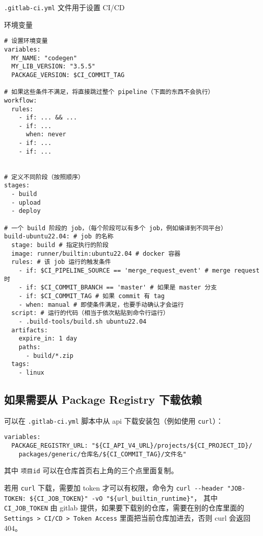 
\verb`.gitlab-ci.yml` 文件用于设置 CI/CD

环境变量
\begin{lstlisting}[language=none]
# 设置环境变量
variables:
  MY_NAME: "codegen"
  MY_LIB_VERSION: "3.5.5"
  PACKAGE_VERSION: $CI_COMMIT_TAG

# 如果这些条件不满足，将直接跳过整个 pipeline（下面的东西不会执行）
workflow:
  rules:
    - if: ... && ...
    - if: ...
      when: never
    - if: ...
    - if: ...


# 定义不同阶段（按照顺序）
stages:
  - build
  - upload
  - deploy

# 一个 build 阶段的 job，（每个阶段可以有多个 job，例如编译到不同平台）
build-ubuntu22.04: # job 的名称
  stage: build # 指定执行的阶段
  image: runner/builtin:ubuntu22.04 # docker 容器
  rules: # 该 job 运行的触发条件
    - if: $CI_PIPELINE_SOURCE == 'merge_request_event' # merge request 时
    - if: $CI_COMMIT_BRANCH == 'master' # 如果是 master 分支
    - if: $CI_COMMIT_TAG # 如果 commit 有 tag
    - when: manual # 即使条件满足，也要手动确认才会运行
  script: # 运行的代码（相当于依次粘贴到命令行运行）
    - .build-tools/build.sh ubuntu22.04
  artifacts:
    expire_in: 1 day
    paths:
      - build/*.zip
  tags:
    - linux
\end{lstlisting}

\subsection{如果需要从 Package Registry 下载依赖}
可以在 \verb`.gitlab-ci.yml` 脚本中从 api 下载安装包（例如使用 \verb`curl`）：
\begin{lstlisting}[language=none]
variables:
  PACKAGE_REGISTRY_URL: "${CI_API_V4_URL}/projects/${CI_PROJECT_ID}/
    packages/generic/仓库名/${CI_COMMIT_TAG}/文件名"
\end{lstlisting}
其中 \verb`项目id` 可以在仓库首页右上角的三个点里面复制。

若用 \verb`curl` 下载，需要加 token 才可以有权限，命令为 \verb`curl --header "JOB-TOKEN: ${CI_JOB_TOKEN}" -vO "${url_builtin_runtime}"`， 其中 \verb`CI_JOB_TOKEN` 由 gitlab 提供，如果要下载别的仓库，需要在别的仓库里面的 \verb`Settings > CI/CD > Token Access` 里面把当前仓库加进去，否则 curl 会返回 404。
